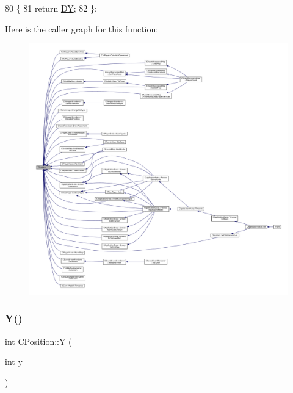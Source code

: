 \begin{DoxyCode}
80                      \{
81             \textcolor{keywordflow}{return} \hyperlink{classCPosition_a84139c9e8eb547e7cf3cb851739943a4}{DY};
82         \};
\end{DoxyCode}
Here is the caller graph for this function\+:\nopagebreak
\begin{figure}[H]
\begin{center}
\leavevmode
\includegraphics[width=350pt]{classCPosition_a1aa8a30e2f08dda1f797736ba8c13a87_icgraph}
\end{center}
\end{figure}
\hypertarget{classCPosition_a182107c1ded8662afc75f876fa1b990d}{}\label{classCPosition_a182107c1ded8662afc75f876fa1b990d} 
\subsubsection{\texorpdfstring{Y()}{Y()}\hspace{0.1cm}{\footnotesize\ttfamily [2/2]}}
{\footnotesize\ttfamily int C\+Position\+::Y (\begin{DoxyParamCaption}\item[{int}]{y }\end{DoxyParamCaption})\hspace{0.3cm}{\ttfamily [inline]}}



